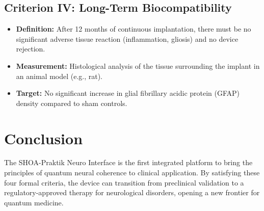 \documentclass[12pt]{article}
\begin{document}
\subsection{Criterion IV: Long-Term Biocompatibility}
\begin{itemize}
    \item \textbf{Definition:} After 12 months of continuous implantation, there must be no significant adverse tissue reaction (inflammation, gliosis) and no device rejection.
    \item \textbf{Measurement:} Histological analysis of the tissue surrounding the implant in an animal model (e.g., rat).
    \item \textbf{Target:} No significant increase in glial fibrillary acidic protein (GFAP) density compared to sham controls.
\end{itemize}

\section{Conclusion}
The SHOA-Praktik Neuro Interface is the first integrated platform to bring the principles of quantum neural coherence to clinical application. By satisfying these four formal criteria, the device can transition from preclinical validation to a regulatory-approved therapy for neurological disorders, opening a new frontier for quantum medicine.
\end{document}
